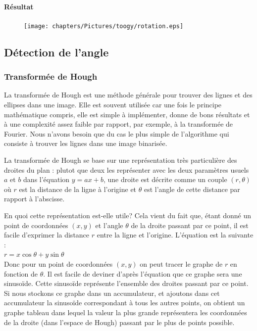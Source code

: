 \paragraph{Résultat}

\begin{figure}
  \centering
  \texttt{[image: chapters/Pictures/toogy/rotation.eps]}
\end{figure}

\subsection{Détection de l'angle}

\subsubsection{Transformée de Hough}

La transformée de Hough est une méthode générale pour trouver des lignes et des ellipses dans une image. Elle est souvent utilisée car une fois le principe mathématique compris, elle est simple à implémenter, donne de bons résultats et à une complexité assez faible par rapport, par exemple, à la transformée de Fourier. Nous n'avons besoin que du cas le plus simple de l'algorithme qui consiste à trouver les lignes dans une image binarisée.

La transformée de Hough se base sur une représentation très particulière des droites du plan : plutot que deux les représenter avec les deux paramètres usuels $a$ et $b$ dans l'équation $y = ax + b$, une droite est décrite comme un couple $(r, \theta)$ où $r$ est la distance de la ligne à l'origine et $\theta$ est l'angle de cette distance par rapport à l'abscisse.

En quoi cette représentation est-elle utile? Cela vient du fait que, étant donné un point de coordonnées $(x, y)$ et l'angle $\theta$ de la droite passant par ce point, il est facile d'exprimer la distance $r$ entre la ligne et l'origine. L'équation est la suivante :\\
$r = x\cos\theta + y\sin\theta$\\
Donc pour un point de coordonnées $(x, y)$ on peut tracer le graphe de $r$ en fonction de $\theta$. Il est facile de deviner d'après l'équation que ce graphe sera une sinusoïde. Cette sinusoïde représente l'ensemble des droites passant par ce point. Si nous stockons ce graphe dans un accumulateur, et ajoutons dans cet accumulateur la sinusoïde correspondant à tous les autres points, on obtient un graphe tableau dans lequel la valeur la plus grande représentera les coordonnées de la droite (dans l'espace de Hough) passant par le plus de points possible.

